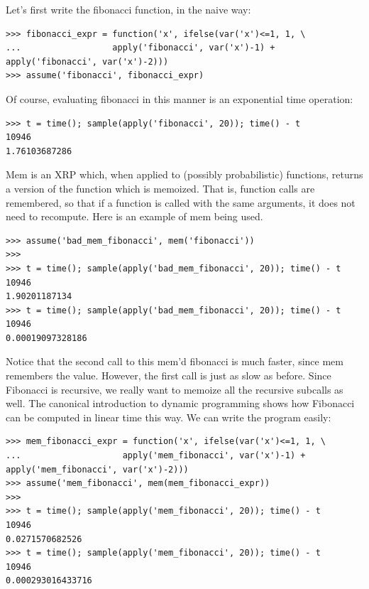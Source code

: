 \documentclass[11pt]{article}
\begin{document}
\noindent Let's first write the fibonacci function, in the naive way:

\begin{small}
\begin{verbatim}
>>> fibonacci_expr = function('x', ifelse(var('x')<=1, 1, \
...                  apply('fibonacci', var('x')-1) + apply('fibonacci', var('x')-2)))
>>> assume('fibonacci', fibonacci_expr)
\end{verbatim}
\end{small}

\noindent Of course, evaluating fibonacci in this manner is an exponential time operation:

\begin{small}
\begin{verbatim}
>>> t = time(); sample(apply('fibonacci', 20)); time() - t
10946
1.76103687286
\end{verbatim}
\end{small}

\noindent Mem is an XRP which, when applied to (possibly probabilistic) functions, returns a version of the function which is memoized.  That is, function calls are remembered, so that if a function is called with the same arguments, it does not need to recompute.  Here is an example of mem being used.

\begin{small}
\begin{verbatim}
>>> assume('bad_mem_fibonacci', mem('fibonacci'))
>>>
>>> t = time(); sample(apply('bad_mem_fibonacci', 20)); time() - t
10946
1.90201187134
>>> t = time(); sample(apply('bad_mem_fibonacci', 20)); time() - t
10946
0.00019097328186
\end{verbatim}
\end{small}

\noindent Notice that the second call to this mem'd fibonacci is much faster, since mem remembers the value.  However, the first call is just as slow as before.  Since Fibonacci is recursive, we really want to memoize all the recursive subcalls as well.  The canonical introduction to dynamic programming shows how Fibonacci can be computed in linear time this way.  We can write the program easily:

\begin{small}
\begin{verbatim}
>>> mem_fibonacci_expr = function('x', ifelse(var('x')<=1, 1, \
...                    apply('mem_fibonacci', var('x')-1) + apply('mem_fibonacci', var('x')-2)))
>>> assume('mem_fibonacci', mem(mem_fibonacci_expr))
>>>
>>> t = time(); sample(apply('mem_fibonacci', 20)); time() - t
10946
0.0271570682526
>>> t = time(); sample(apply('mem_fibonacci', 20)); time() - t
10946
0.000293016433716
\end{verbatim}
\end{small}
\end{document}
